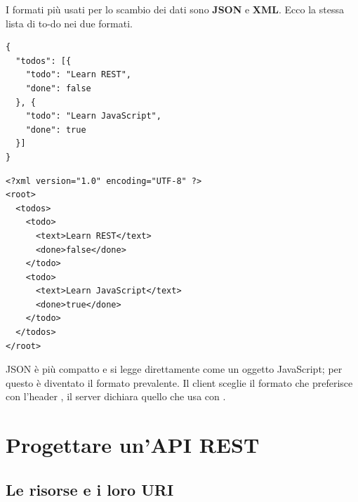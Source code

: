 \begin{center}
\end{center}

I formati più usati per lo scambio dei dati sono \textbf{JSON} e \textbf{XML}. Ecco la stessa lista di to-do nei due
formati.

\noindent\begin{minipage}[t]{0.42\textwidth}
\begin{lstlisting}[style=json, name=todos.json]
{
  "todos": [{
    "todo": "Learn REST",
    "done": false
  }, {
    "todo": "Learn JavaScript",
    "done": true
  }]
}
\end{lstlisting}
\end{minipage}\hfill
\begin{minipage}[t]{0.55\textwidth}
\begin{lstlisting}[style=xml, name=todos.xml]
<?xml version="1.0" encoding="UTF-8" ?>
<root>
  <todos>
    <todo>
      <text>Learn REST</text>
      <done>false</done>
    </todo>
    <todo>
      <text>Learn JavaScript</text>
      <done>true</done>
    </todo>
  </todos>
</root>
\end{lstlisting}
\end{minipage}

JSON è più compatto e si legge direttamente come un oggetto JavaScript; per questo è diventato il formato prevalente. Il
client sceglie il formato che preferisce con l'header , il server dichiara quello che usa con
.

\section{Progettare un'API REST}

\subsection{Le risorse e i loro URI}

